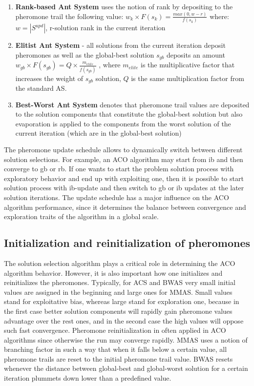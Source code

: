 \documentclass[11pt,a4paper,oneside]{book}
\begin{document}
\begin{enumerate}
\item {\textbf{Rank-based Ant System} uses the notion of rank by depositing \cite{ras} to the pheromone trail the following value:
$w_k \times F(s_k) = \frac{max(0,w-r)}{f(s_k)}$
where: $w=|S^{upd}|$, r-solution rank in the current iteration
}

\item {\textbf{Elitist Ant System} - all solutions from the current iteration deposit pheromones as well as the global-best solution $s_{gb}$ deposits an amount $w_{gb} \times F(s_{gb}) = Q \times \frac{m_{elite}}{f(s_{gb})}$ \cite{eas}, where $m_{elite}$ is the multiplicative factor that increases the weight of $s_{gb}$ solution, $Q$ is the same multiplication factor from the standard AS.}

\item {\textbf{Best-Worst Ant System} denotes that pheromone trail values are deposited to the solution components that constitute the global-best solution but also evaporation is applied to the components from the worst solution of the current iteration (which are in the global-best solution) \cite{bwas}}

\end{enumerate}

The pheromone update schedule allows to dynamically switch between different solution selections. For example, an ACO algorithm may start from ib and then converge to gb or rb. If one wants to start the problem solution process with exploratory behavior and end up with exploiting one, then it is possible to start solution process with ib-update and then switch to gb or ib updates at the later solution iterations. The update schedule has a major influence on the ACO algorithm performance, since it determines the balance between convergence and exploration traits of the algorithm in a global scale.



\subsection{Initialization and reinitialization of pheromones}

The solution selection algorithm plays a critical role in determining the ACO algorithm behavior. However, it is also important how one initializes and reinitializes the pheromones. Typically, for ACS and BWAS very small initial values are assigned in the beginning and large ones for MMAS. Small values stand for exploitative bias, whereas large stand for exploration one, because in the first case better solution components will rapidly gain pheromone values advantage over the rest ones, and in the second case the high values will oppose such fast convergence. Pheromone reinitialization in often applied in ACO algorithms since otherwise the run may converge rapidly. MMAS uses a notion of branching factor in such a way that when it falls below a certain value, all pheromone trails are reset to the initial pheromone trail value. BWAS resets whenever the distance between global-best and global-worst solution for a certain iteration plummets down lower than a predefined value.
\end{document}
